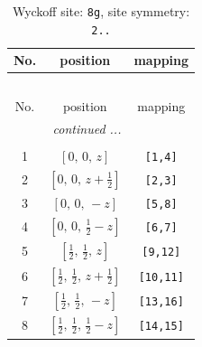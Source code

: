 \documentclass[fleqn,8pt]{jsarticle}
\begin{document}
\renewcommand{\arraystretch}{1.2}
\begin{longtable}{ccc}
\caption{Wyckoff site: {\tt 8g}, site symmetry: {\tt 2..}}
 \\
 \hline \hline
No. & position & mapping \\ \hline \endfirsthead

\multicolumn{2}{l}{\tablename\ \thetable{}} \\
 \hline \hline
No. & position & mapping \\ \hline \endhead

 \hline \hline
\multicolumn{2}{r}{\footnotesize\it continued ...} \\ \endfoot

 \hline \hline
\multicolumn{2}{r}{} \\ \endlastfoot

1 & $\left[ 0,\, 0,\, z \right]$ & {\tt [1,4]} \\ \hline
2 & $\left[ 0,\, 0,\, z + \frac{1}{2} \right]$ & {\tt [2,3]} \\ \hline
3 & $\left[ 0,\, 0,\, - z \right]$ & {\tt [5,8]} \\ \hline
4 & $\left[ 0,\, 0,\, \frac{1}{2} - z \right]$ & {\tt [6,7]} \\ \hline
5 & $\left[ \frac{1}{2},\, \frac{1}{2},\, z \right]$ & {\tt [9,12]} \\ \hline
6 & $\left[ \frac{1}{2},\, \frac{1}{2},\, z + \frac{1}{2} \right]$ & {\tt [10,11]} \\ \hline
7 & $\left[ \frac{1}{2},\, \frac{1}{2},\, - z \right]$ & {\tt [13,16]} \\ \hline
8 & $\left[ \frac{1}{2},\, \frac{1}{2},\, \frac{1}{2} - z \right]$ & {\tt [14,15]} \\
\end{longtable}
\renewcommand{\arraystretch}{1.2}
\end{document}
